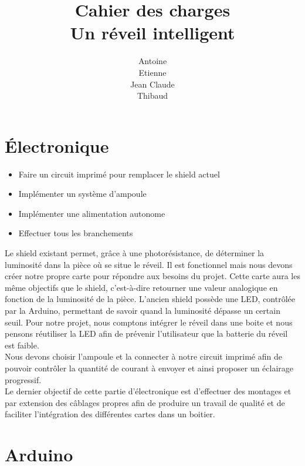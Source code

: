 \documentclass[a4paper, 12pt, french]{article}
\title{Cahier des charges \\ Un réveil intelligent}
\author{
	Antoine \bsc{Augusti}\\
	Etienne \bsc{Batise}\\
	Jean Claude \bsc{Bernard}\\
	Thibaud \bsc{Dauce}\\}
\date{}
\begin{document}
\maketitle
\thispagestyle{empty}

\section{Électronique} %
\label{sec:_lectronique}

\begin{itemize}
	\item Faire un circuit imprimé pour remplacer le shield actuel
	\item Implémenter un système d'ampoule
	\item Implémenter une alimentation autonome
	\item Effectuer tous les branchements 
\end{itemize}
\vspace{20px}

Le shield existant permet, grâce à une photorésistance, de déterminer la luminosité dans la pièce où se situe le réveil. Il est fonctionnel mais nous devons créer notre propre carte pour répondre aux besoins du projet. Cette carte aura les même objectifs que le shield, c'est-à-dire retourner une valeur analogique en fonction de la luminosité de la pièce. L'ancien shield possède une LED, contrôlée par la Arduino, permettant de savoir quand la luminosité dépasse un certain seuil. Pour notre projet, nous comptons intégrer le réveil dans une boite et nous pensons réutiliser la LED afin de prévenir l'utilisateur que la batterie du réveil est faible. \\

Nous devons choisir l'ampoule et la connecter à notre circuit imprimé afin de pouvoir contrôler la quantité de courant à envoyer et ainsi proposer un éclairage progressif. \\

Le dernier objectif de cette partie d'électronique est d'effectuer des montages et par extension des câblages propres afin de produire un travail de qualité et de faciliter l'intégration des différentes cartes dans un boitier. \\


\section{Arduino} %
\label{sec:arduino}
\end{document}
